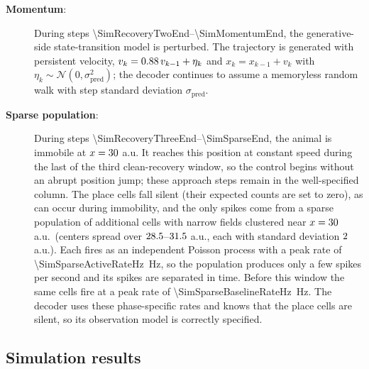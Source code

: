 \documentclass[12pt]{article}
\begin{document}
\begin{description}
    \item[\textbf{Momentum}:] During steps \num{\SimRecoveryTwoEnd}--\num{\SimMomentumEnd}, the generative-side state-transition model is perturbed. The trajectory is generated with persistent velocity, $v_k = 0.88\, v_{k-1} + \eta_k$ and $x_k = x_{k-1} + v_k$ with $\eta_k \sim \mathcal{N}(0, \sigma_{\mathrm{pred}}^{2})$; the decoder continues to assume a memoryless random walk with step standard deviation $\sigma_{\mathrm{pred}}$.
    \item[\textbf{Sparse population}:] During steps \num{\SimRecoveryThreeEnd}--\num{\SimSparseEnd}, the animal is immobile at $x=30$ a.u. It reaches this position at constant speed during the last \SimSparseApproachDuration{} of the third clean-recovery window, so the control begins without an abrupt position jump; these approach steps remain in the well-specified column. The \SimNPlaceCellsWord{} place cells fall silent (their expected counts are set to zero), as can occur during immobility, and the only spikes come from a sparse population of \SimNSparseCellsWord{} additional cells with narrow fields clustered near $x=30$ a.u.\ (centers spread over $28.5$--$31.5$ a.u., each with standard deviation $2$ a.u.). Each fires as an independent Poisson process with a peak rate of \SI{\SimSparseActiveRateHz}{Hz}, so the population produces only a few spikes per second and its spikes are separated in time. Before this window the same cells fire at a peak rate of \SI{\SimSparseBaselineRateHz}{Hz}. The decoder uses these phase-specific rates and knows that the place cells are silent, so its observation model is correctly specified.
\end{description}

\subsection*{Simulation results}\label{sec:simresults}
\end{document}
